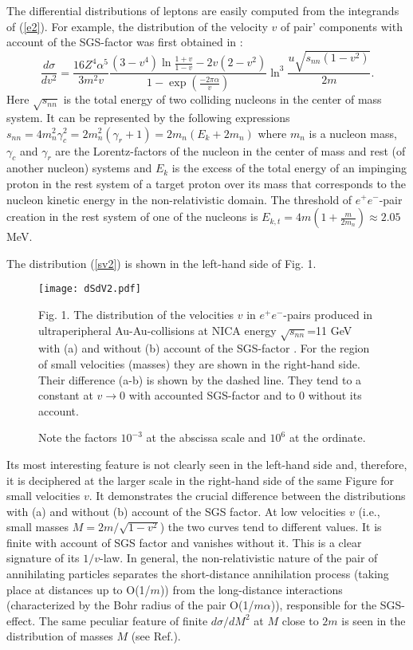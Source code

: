 \documentclass[12pt]{article}
\begin{document}
The differential distributions of leptons are easily computed from
the integrands of (\ref{e2}). For example, the distribution of the
velocity $v$ of pair' components with account of the SGS-factor 
was first obtained in \cite{dgm}:
\begin{equation}
\frac {d\sigma }{dv^2}=\frac {16Z^4\alpha ^5}{3m^2v}
\frac {(3-v^4)\ln \frac {1+v}{1-v}-2v(2-v^2)}
{1-\exp (\frac {-2\pi \alpha}{v})}
\ln^3 \frac {u\sqrt {s_{nn}(1-v^2)}}{2m}.
\label{sv2}
\end{equation}
Here $\sqrt {s_{nn}}$ is the total energy of two colliding nucleons in the
center of mass system. It can be
represented by the following expressions $s_{nn}=4m^2_n\gamma ^2_c=
2m^2_n(\gamma _r+1)=2m_n(E_k+2m_n)$ where $m_n$ is a nucleon mass,
$\gamma _c$ and $\gamma _r$ are the Lorentz-factors of the nucleon in the 
center of mass and rest (of another nucleon) systems and $E_k$ is
the excess of the total energy of an impinging proton in the rest system
of a target proton over its mass that corresponds to the nucleon kinetic 
energy in the non-relativistic domain. The threshold of $e^+e^-$-pair creation 
in the rest system of one of the nucleons is 
$E_{k,t}=4m(1+\frac {m}{2m_n})\approx 2.05$ MeV.

The distribution (\ref{sv2}) is shown in the left-hand side of Fig. 1. 

\begin{figure}

\centerline{\texttt{[image: dSdV2.pdf]}}

Fig. 1. The distribution of the velocities $v$ in $e^+e^-$-pairs produced 
in ultraperipheral Au-Au-collisions at NICA energy $\sqrt {s_{nn}}$=11 GeV
with (a) and without (b) account of the SGS-factor \cite{dgm}. 
For the region of small 
velocities (masses) they are shown in the right-hand side. Their difference 
(a-b) is shown by the dashed line. They tend to a constant at $v \rightarrow 0 $ 
with accounted SGS-factor and to 0 without its account. 

Note the factors $10^{-3}$ at the abscissa scale and $10^6$ at the ordinate.
\end{figure}

Its most interesting feature is not clearly seen in the left-hand side and, 
therefore, it is deciphered at the larger scale in the right-hand side of the 
same Figure for small velocities $v$. It demonstrates the crucial 
difference between the distributions with (a) and without (b) account of the 
SGS factor. At low velocities $v$ (i.e., small masses $M=2m/\sqrt {1-v^2}$) the 
two curves tend to different values. It is finite with account of SGS factor 
and vanishes without it. This is a clear signature of its $1/v$-law.
In general, the non-relativistic nature of the pair of annihilating
particles separates the short-distance annihilation process (taking place at
 distances up to O(1/$m$)) from the long-distance interactions (characterized by
the Bohr radius of the pair O(1/$m\alpha $)), responsible for the SGS-effect.
The same peculiar feature of finite $d\sigma /dM^2$ at $M$ close to $2m$
is seen in the distribution of masses $M$ (see Ref.\cite{dgm}).
\end{document}

